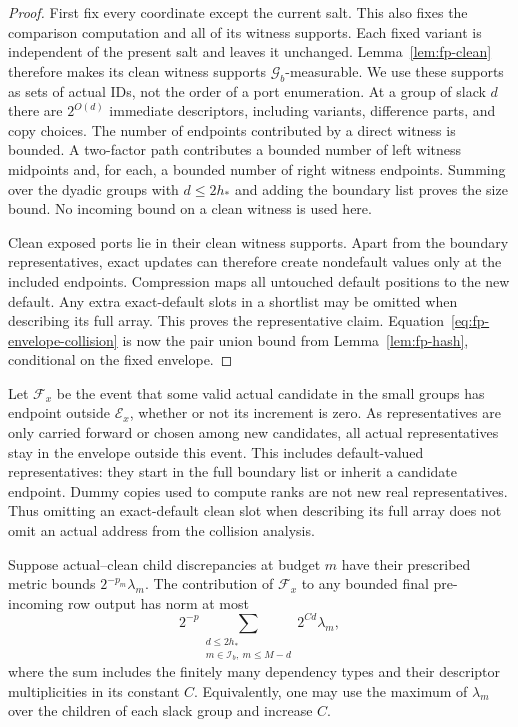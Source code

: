 \begin{proof}
First fix every coordinate except the current salt. This also fixes the comparison computation and all of its witness supports. Each fixed variant is independent of the present salt and leaves it
unchanged.  Lemma~\ref{lem:fp-clean} therefore makes its clean witness
supports $\mathcal G_b$-measurable.  We use these supports as sets of
actual IDs, not the order of a port enumeration.  At a group of slack
$d$ there are $2^{O(d)}$ immediate descriptors, including variants,
difference parts, and copy choices.  The number of endpoints contributed by a direct
witness is bounded.  A two-factor path contributes a bounded number of
left witness midpoints and, for each, a bounded number of right witness
endpoints.  Summing over the dyadic groups with $d\le2h_*$ and adding the
boundary list proves the size bound.  No incoming bound on a clean
witness is used here.

Clean exposed ports lie in their clean witness supports.  Apart from the
boundary representatives, exact updates can therefore create nondefault
values only at the included endpoints.  Compression maps all untouched
default positions to the new default.  Any extra exact-default slots in
a shortlist may be omitted when describing its full array.  This proves
the representative claim.  Equation~\eqref{eq:fp-envelope-collision}
is now the pair union bound from Lemma~\ref{lem:fp-hash}, conditional on
the fixed envelope.
\end{proof}

Let $\mathcal F_x$ be the event that some valid actual candidate in the
small groups has endpoint outside $\mathcal E_x$, whether or not its
increment is zero.  As representatives are
only carried forward or chosen among new candidates, all actual
representatives stay in the envelope outside this event.
This includes default-valued representatives: they start in the full
boundary list or inherit a candidate endpoint.  Dummy copies used to
compute ranks are not new real representatives.  Thus omitting an
exact-default clean slot when describing its full array does not omit
an actual address from the collision analysis.

\begin{lemma}\label{lem:fp-escape}
Suppose actual--clean child discrepancies at budget $m$ have their
prescribed metric bounds $2^{-p_m}\lambda_m$.  The contribution of
$\mathcal F_x$ to any bounded final pre-incoming row output has norm at
most
\begin{equation}
 2^{-p}\sum_{\substack{d\le2h_*\\m\in\mathcal I_b,\ m\le M-d}}
                 2^{C d}\lambda_m,
 \label{eq:fp-escape-charge}
\end{equation}
where the sum includes the finitely many dependency types and their
descriptor multiplicities in its constant $C$.  Equivalently, one may
use the maximum of $\lambda_m$ over the children of each slack group
and increase $C$.
\end{lemma}

